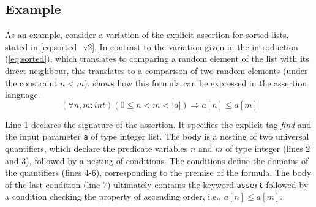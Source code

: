 \subsection{Example}
As an example, consider a variation of the explicit assertion for sorted lists, stated in \eqref{eq:sorted_v2}. In contrast to the variation given in the introduction (\eqref{eq:sorted}), which translates to comparing a random element of the list with its direct neighbour, this translates to a comparison of two random elements (under the constraint $n < m$).  shows how this formula can be expressed in the assertion language.
\begin{equation}\label{eq:sorted_v2}
	(\forall n,m : int) (0 \leq n < m < |a|) \Rightarrow a[n] \leq a[m]
\end{equation}


Line 1 declares the signature of the assertion. It specifies the explicit tag \textit{find} and the input parameter \texttt{a} of type integer list. The body is a nesting of two universal quantifiers, which declare the predicate variables $n$ and $m$ of type integer (lines 2 and 3), followed by a nesting of conditions. The conditions define the domains of the quantifiers (lines 4-6), corresponding to the premise of the formula. The body of the last condition (line 7) ultimately contains the keyword \texttt{assert} followed by a condition checking the property of ascending order, i.e.,  $a[n] \leq a[m]$.

